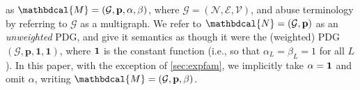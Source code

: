 \documentclass[letterpaper]{article} %
\theoremstyle{plain}
\theoremstyle{definition}
\theoremstyle{remark}
\newcommand\mat[1]{\mathbf{#1}}
\newcommand{\V}{\mathcal V}
\newcommand{\N}{\mathcal N}
\newcommand{\Ed}{\mathcal E}
\newcommand{\dg}[1]{\mathbdcal{#1}}
\newcommand{\Gr}{\mathcal G}
\begin{document}
\begin{defn}
as $\dg M = (\Gr,\mat p, \alpha,\beta)$, where $\Gr = (\N,\Ed,\V)$, and
abuse terminology by referring to $\Gr$ as a multigraph.
We refer to 
${\dg N} = (\Gr, \mat p)$ as an \emph{unweighted} PDG,
and give it semantics as though it were the (weighted) PDG $(\Gr, \mat p, \mat 1, \mat 1)$, where
$\bf 1$ is the constant function (i.e., so that $\alpha_L = \beta_L = 1$ for all $L$). 
%
%
In this paper, with the exception of \cref{sec:expfam},  we implicitly take $\alpha = {\bf 1}$
and omit $\alpha$, writing $\dg M = (\Gr, \mat p, \beta)$.%

\end{defn}
\end{document}
